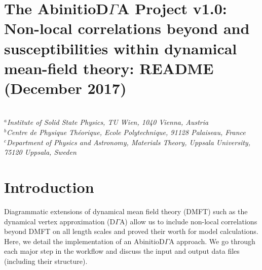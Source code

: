 \documentclass[a4paper,11pt]{article}
\numberwithin{equation}{section} %
\begin{document}
\section*{The AbinitioD$\Gamma$A Project v1.0: Non-local correlations beyond and susceptibilities within dynamical mean-field theory: README (December 2017)}
\begin{framed}
\\
\center\textit{{$^a$Institute of Solid State Physics, TU Wien, 1040 Vienna, Austria\\
$^b$Centre de Physique Théorique, Ecole Polytechnique, 91128 Palaiseau, France\\
$^c$Department of Physics and Astronomy, Materials Theory, Uppsala University, 75120 Uppsala, Sweden}}
\end{framed}

\section{Introduction}
Diagrammatic extensions of dynamical mean field theory (DMFT) such as the dynamical vertex approximation (D$\Gamma$A) allow us to include non-local correlations beyond DMFT on all length scales and proved their worth for model calculations. Here, we detail the implementation of an AbinitioD$\Gamma$A approach. We go through each major step in the workflow and discuss the input and output data files (including their structure).

\end{document}
